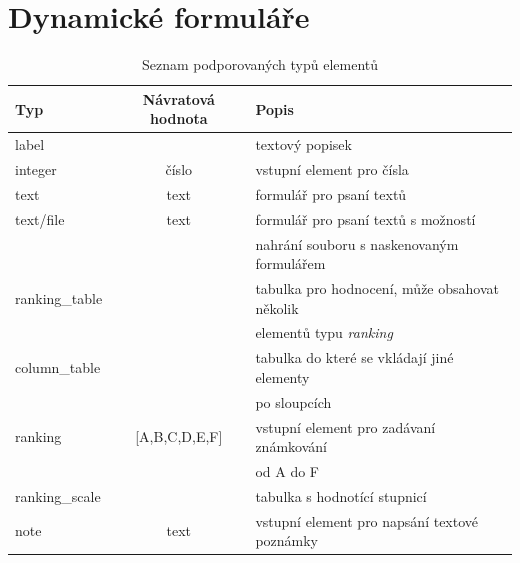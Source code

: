 \chapter{Dynamické formuláře}
\label{sec:forms}
\begin{table}[h]
\begin{center}
\begin{tabular}{|l|c|l|}

\hline
\textbf{Typ} & \textbf{Návratová hodnota} & \textbf{Popis} \\ \hline
label &  & textový popisek \\\hline
integer & číslo & vstupní element pro čísla \\ \hline
text & text & formulář pro psaní textů \\\hline
text/file & text & formulář pro psaní textů s možností \\ & &  nahrání souboru s naskenovaným formulářem \\\hline
ranking\_table &  & tabulka pro hodnocení, může obsahovat několik \\ & & elementů typu \textit{ranking} \\\hline
column\_table & & tabulka do které se vkládají jiné elementy \\ & &  po sloupcích \\\hline
ranking & [A,B,C,D,E,F] & vstupní element pro zadávaní známkování  \\ & &   od A do F \\\hline
ranking\_scale & & tabulka s hodnotící stupnicí \\\hline
note & text & vstupní element pro napsání textové poznámky \\\hline

\end{tabular}
\caption{Seznam podporovaných typů elementů}
\label{tab:elements}
\end{center}
\end{table}

